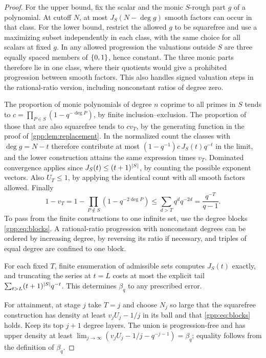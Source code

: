\begin{proof}
For the upper bound, fix the scalar and the monic $S$-rough part $g$ of a polynomial. At
cutoff $N$, at most $J_S(N-\deg g)$ smooth factors can occur in that class. For the lower
bound, restrict the allowed $g$ to be squarefree and use a maximizing subset independently
in each class, with the same choice for all scalars at fixed $g$. In any allowed
progression the valuations outside $S$ are three equally spaced members of $\{0,1\}$,
hence constant. The three monic parts therefore lie in one class, where their quotients
would give a prohibited progression between smooth factors. This also handles signed
valuation steps in the rational-ratio version, including nonconstant ratios of degree
zero.

The proportion of monic polynomials of degree $n$ coprime to all primes in $S$ tends to
$c=\prod_{P\in S}(1-q^{-\deg P})$, by finite inclusion--exclusion. The proportion of those
that are also squarefree tends to $cv_T$, by the generating function in the proof of
\cref{gpp:lem:replacement}. In the normalized count the classes with $\deg g=N-t$
therefore contribute at most $(1-q^{-1})c\,J_S(t)q^{-t}$ in the limit, and the lower
construction attains the same expression times $v_T$. Dominated convergence applies since
$J_S(t)\le(t+1)^{\lvert S\rvert}$, by counting the possible exponent vectors. Also $U_T\le1$, by
applying the identical count with all smooth factors allowed. Finally
\[
 1-v_T=1-\prod_{P\notin S}(1-q^{-2\deg P})\le\sum_{d>T}q^dq^{-2d}=\frac{q^{-T}}{q-1}.
\]
To pass from the finite constructions to one infinite set, use the degree blocks
\eqref{gpp:eq:blocks}. A rational-ratio progression with nonconstant degrees can be
ordered by increasing degree, by reversing its ratio if necessary, and triples of equal
degree are confined to one block.

For each fixed $T$, finite enumeration of admissible sets computes $J_S(t)$ exactly, and
truncating the series at $t=L$ costs at most the explicit tail
$\sum_{t>L}(t+1)^{\lvert S\rvert}q^{-t}$. This determines $\beta_q$ to any prescribed error.

For attainment, at stage $j$ take $T=j$ and choose $N_j$ so large that the squarefree
construction has density at least $v_jU_j-1/j$ in its ball and that
\eqref{gpp:eq:blocks} holds. Keep its top $j+1$ degree layers. The union is
progression-free and has upper density at least
$\lim_{j\to\infty}(v_jU_j-1/j-q^{-j-1})=\beta_q$; equality follows from the definition of
$\beta_q$.
\end{proof}

